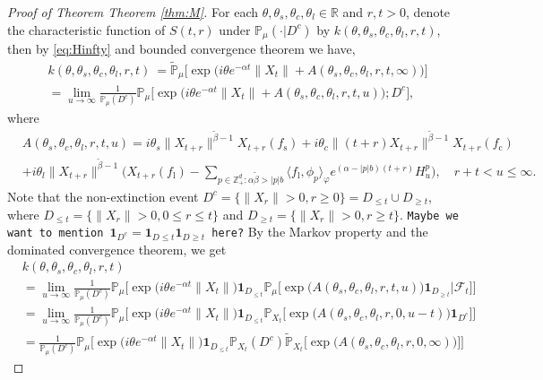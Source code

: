 \documentclass[12pt,a4paper]{amsart}
\theoremstyle{plain}
\theoremstyle{definition}
\numberwithin{equation}{section}
\begin{document}
\begin{proof}[Proof of Theorem Theorem \ref{thm:M}]
For each $\theta,\theta_s,\theta_c,\theta_l\in \mathbb R$ and $r,t>0$, denote the characteristic function of  $S(t,r)$ under $\mathbb P_{\mu}(\cdot|D^c)$ by $k(\theta,\theta_s,\theta_c,\theta_l,r,t)$, {\color{red}then by \eqref{eq:Hinfty} and bounded convergence theorem} we have,
\begin{align}
   &k(\theta,\theta_s,\theta_c,\theta_l,r,t)\
   =\widetilde{\mathbb P}_{\mu}\Big[\exp\Big( i\theta e^{-\alpha t}\|X_t\|+A(\theta_s,\theta_c,\theta_l,r,t,\infty)\Big)\Big]\\
  &=\lim_{u\rightarrow \infty}\frac{1}{\mathbb P_{\mu}(D^c)}\mathbb P_{\mu}\Big[\exp\Big( i\theta e^{-\alpha t}\|X_t\|+A(\theta_s,\theta_c,\theta_l,r,t,u)\Big);D^c\Big],
\end{align}
where
\begin{align}
 &A(\theta_s,\theta_c,\theta_l,r,t,u)=i\theta_s\|X_{t+r}\|^{\tilde{\beta}-1}X_{t+r}(f_\mathrm s)+ i\theta_c \|(t+r)X_{t+r}\|^{\tilde{\beta}-1}X_{t+r}(f_\mathrm c)\\
&+i\theta_l \|X_{t+r}\|^{\tilde{\beta}-1}\Big(X_{t+r}(f_\mathrm l)-\sum_{p\in \mathbb Z_+^d:\alpha\tilde{\beta}>|p|b}\langle f_\mathrm l,\phi_p\rangle_{\varphi}e^{(\alpha-|p|b)(t+r)}H_{u}^p\Big),\quad r+t<u\leq \infty.
\end{align}
Note that the non-extinction event $D^c=\{\|X_r\|>0, r\geq 0\}=D_{\leq t}\cup D_{\geq t}$, where $D_{\leq t}=\{\|X_r\|>0, 0\leq r\leq t\}$ and $D_{\geq t}=\{\|X_r\|>0, r\geq t\}$. 
{\color{blue} \tt Maybe we want to mention $\mathbf 1_{D^c} = \mathbf 1_{D\leq t} \mathbf 1_{D\geq t}$ here?}
By the Markov property and the dominated convergence theorem, we get
\begin{align}
  & k(\theta,\theta_s,\theta_c,\theta_l,r,t)\\
&=\lim_{u\rightarrow \infty}\frac{1}{\mathbb P_{\mu}(D^c)}\mathbb P_{\mu}\Big[\exp\Big(i\theta e^{-\alpha t}\|X_t\|\Big)\mathbf 1_{D_{\leq t}} \mathbb P_{\mu}\Big[\exp\Big(A(\theta_s,\theta_c,\theta_l,r,t,u)\Big)\mathbf 1_{D_{\geq t}}\Big|\mathscr F_t\Big]\Big]\\
&=\lim_{u\rightarrow\infty}\frac{1}{\mathbb P_{\mu}(D^c)}\mathbb P_{\mu}\Big[\exp\Big( i\theta e^{-\alpha t}\|X_t\|\Big)\mathbf 1_{D_{\leq t}}\mathbb P_{X_t}\Big[\exp\Big(A(\theta_s,\theta_c,\theta_l,r,0,u-t)\Big)\mathbf 1_{D^c}\Big]\Big]\\
&=\frac{1}{\mathbb P_{\mu}(D^c)}\mathbb P_{\mu}\Big[\exp\Big( i\theta e^{-\alpha t}\|X_t\|\Big)\mathbf 1_{D_{\leq t}}\mathbb P_{X_t}(D^c)\widetilde{\mathbb P}_{X_t}\Big[\exp\Big(A(\theta_s,\theta_c,\theta_l,r,0,\infty)\Big)\Big]\Big]

\end{align}
\end{proof}
\end{document}
